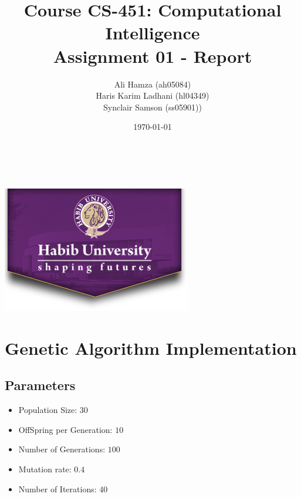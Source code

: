\documentclass[11pt, letterpaper]{article}
\begin{document}
\title{\large Course CS-451: Computational Intelligence\\[0.5cm]
        \bf\Large Assignment 01 - Report}
\author{\large Ali Hamza (ah05084) \\ Haris Karim Ladhani (hl04349) \\ Synclair Samson (ss05901))}
\date{\today}
\makeatletter
    \begin{titlepage}
        \begin{center}
        \vbox{}\vspace{5cm}
            {\@title }\\[3cm] 
            {\@author}\\
            \vfill \includegraphics[scale=0.5]{images/logo.png}\\[1cm]
            {\@date}
        \end{center}
    \end{titlepage}
\makeatother

\newpage

\tableofcontents

\newpage

\section{Genetic Algorithm Implementation}
\subsection{Parameters}
\begin{itemize}
    \item Population Size: $30$
    \item OffSpring per Generation: $10$
    \item Number of Generations: $100$
    \item Mutation rate: $0.4$
    \item Number of Iterations: $40$ 
\end{itemize}
\end{document}
